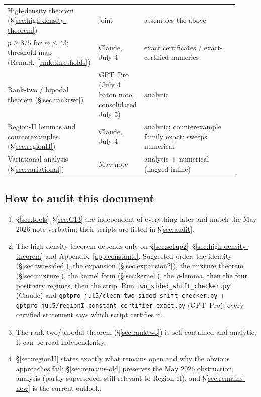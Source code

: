 \documentclass[11pt]{article}
\begin{document}
\begin{center}
\begin{tabular}{p{0.34\linewidth}p{0.17\linewidth}p{0.4\linewidth}}
High-density theorem (\S\ref{sec:high-density-theorem}) & joint & assembles the above \\
$p\ge3/5$ for $m\le43$; threshold map (Remark~\ref{rmk:thresholds}) & Claude, July 4 & exact certificates / exact-certified numerics \\
Rank-two / bipodal theorem (\S\ref{sec:ranktwo}) & GPT~Pro (July 4 baton note, consolidated July 5) & analytic \\
Region-II lemmas and counterexamples (\S\ref{sec:regionII}) & Claude, July 4 & analytic; counterexample family exact; sweeps numerical \\
Variational analysis (\S\ref{sec:variational}) & May note & analytic + numerical (flagged inline) \\
\hline
\end{tabular}
\end{center}

\subsection*{How to audit this document}

\begin{enumerate}[label=\textup{(\arabic*)}]
\item \S\ref{sec:tools}--\S\ref{sec:C13} are independent of everything later and match the May 2026 note verbatim; their scripts are listed in \S\ref{sec:audit}.
\item The high-density theorem depends only on \S\ref{sec:setup2}--\S\ref{sec:high-density-theorem} and Appendix~\ref{app:constants}.  Suggested order: the identity (\S\ref{sec:two-sided}), the expansion (\S\ref{sec:expansion2}), the mixture theorem (\S\ref{sec:mixture}), the kernel form (\S\ref{sec:kernel}), the $\rho$-lemma, then the four positivity regimes, then the strip.  Run \texttt{two\_sided\_shift\_checker.py} (Claude) and \texttt{gptpro\_jul5/clean\_two\_sided\_shift\_checker.py} + \texttt{gptpro\_jul5/regionI\_constant\_certifier\_exact.py} (GPT~Pro); every certified statement says which script certifies it.
\item The rank-two/bipodal theorem (\S\ref{sec:ranktwo}) is self-contained and analytic; it can be read independently.
\item \S\ref{sec:regionII} states exactly what remains open and why the obvious approaches fail; \S\ref{sec:remains-old} preserves the May 2026 obstruction analysis (partly superseded, still relevant to Region II), and \S\ref{sec:remains-new} is the current outlook.
\end{enumerate}
\end{document}

